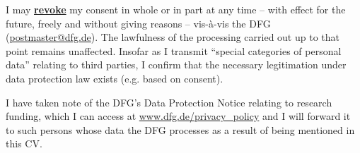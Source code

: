\documentclass[english]{dfgcv}
\begin{document}
I may \textbf{\underline{revoke}} my consent in whole or in part at any time – with effect for the future, freely and without giving reasons – vis-à-vis the DFG (\href{mailto:postmaster@dfg.de}{postmaster@dfg.de}). The lawfulness of the processing carried out up to that point remains unaffected. Insofar as I transmit \enquote{special categories of personal data} relating to third parties, I confirm that the necessary legitimation under data protection law exists (e.g. based on consent).

I have taken note of the DFG's Data Protection Notice relating to research funding, which I can access at \url{www.dfg.de/privacy_policy} and I will forward it to such persons whose data the DFG processes as a result of being mentioned in this CV.
\end{document}
